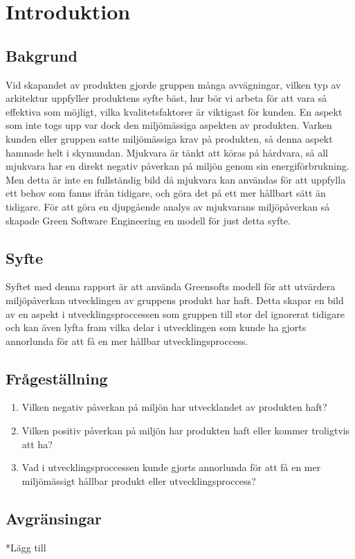 \section{Introduktion}
\label{sec:joel_a-introduction}

\subsection{Bakgrund}
Vid skapandet av produkten gjorde gruppen många avvägningar, vilken typ av arkitektur uppfyller produktens syfte bäst, hur bör vi arbeta för att vara så effektiva som möjligt, vilka kvalitetsfaktorer är viktigast för kunden. En aspekt som inte togs upp var dock den miljömässiga aspekten av produkten. Varken kunden eller gruppen satte miljömässiga krav på produkten, så denna aspekt hamnade helt i skymundan. Mjukvara är tänkt att köras på hårdvara, så all mjukvara har en direkt negativ påverkan på miljön genom sin energiförbrukning. Men detta är inte en fullständig bild då mjukvara kan användas för att uppfylla ett behov som fanns ifrån tidigare, och göra det på ett mer hållbart sätt än tidigare. För att göra en djupgående analys av mjukvarans miljöpåverkan så skapade Green Software Engineering en modell för just detta syfte\cite{greensoft}.

\subsection{Syfte}
Syftet med denna rapport är att använda Greensofts modell för att utvärdera miljöpåverkan utvecklingen av gruppens produkt har haft. Detta skapar en bild av en aspekt i utvecklingsproccessen som gruppen till stor del ignorerat tidigare och kan även lyfta fram vilka delar i utvecklingen som kunde ha gjorts annorlunda för att få en mer hållbar utvecklingsproccess.



\subsection{Frågeställning}
\label{subsec:joel_a-research-questions}

\begin{enumerate}
\item Vilken negativ påverkan på miljön har utvecklandet av produkten haft?

\item Vilken positiv påverkan på miljön har produkten haft eller kommer troligtvis att ha?

\item Vad i utvecklingsproccessen kunde gjorts annorlunda för att få en mer miljömässigt hållbar produkt eller utvecklingsproccess?

\end{enumerate}

\subsection{Avgränsingar}
\label{subsec:joel_a-delimitations}

*Lägg till